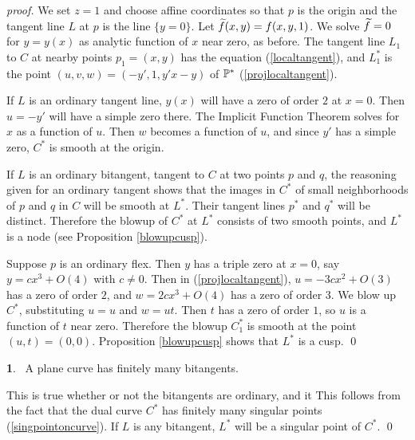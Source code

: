 \documentclass[leqno]{book}
\newcommand\Marginnote[1]{\marginnote{\hspace{-12pt}\normalfont{#1}}}
\theoremstyle{definition}%
\numberwithin{equation}{section}
\theoremstyle{theorem} %
\newtheorem{corollary}[equation]{}
\renewenvironment{proof}{\no \emph{proof.}}{}
\begin{document}
\begin{proof}  We set $z=1$ and
 choose affine coordinates so that $p$ is the origin and the tangent
 line $L$ at $p$ is  the line $\{y=0\}$.  Let $\widetilde f(x,y)=f(x,y,1)$.  We solve
 $\widetilde f = 0$ for $y = y(x)$ as analytic function of $x$ near zero, as
 before.  The tangent line $L_1$ to $C$ at  nearby points
 $p_1=(x,y)$ has the equation (\ref{localtangent}), and $L_1^*$ is
 the point $(u,v,w) =
 (-y',1,y'x-y)$ of $\mathbb{P}^*$ (\ref{projlocaltangent}).


If $L$ is an ordinary tangent line, $y(x)$ will have a zero of order
$2$ at $x=0$.  Then $u = -y'$ will have a simple zero there.  The
Implicit Function Theorem solves for $x$ as a function of $u$.  Then
$w$ becomes a function of $u$, and since $y'$ has a simple zero, $C^*$
is smooth at the origin.

If $L$ is an ordinary bitangent, tangent to $C$ at two points $p$
and $q$, the reasoning given for an ordinary tangent shows that the
images in $C^*$ of small neighborhoods of $p$ and $q$ in $C$ will be
smooth at $L^*$.  Their tangent lines $p^*$ and $q^*$ will
be distinct.  Therefore the blowup of $C^*$ at $L^*$ consists of
two smooth points, and $L^*$ is a node (see Proposition
\ref{blowupcusp}).

Suppose $p$ is an ordinary flex.  Then $y$ has a triple zero at $x=0$,
say $y = cx^3 + O(4)$ with $c\neq 0$.  Then in
(\ref{projlocaltangent}),
$u= -3cx^2+
O(3)$ has a zero of order $2$, and  $w= 2cx^3+O(4)$
 has a zero of order $3$.  We
blow up $C^*$, substituting $u=u$ and $w=ut$. Then $t$ has a zero of
order $1$, so $u$ is a function of $t$ near zero.  Therefore the
blowup $C_1^*$ is smooth at the point $(u,t) = (0,0)$. Proposition
\ref{blowupcusp} shows that $L^*$ is a cusp. \qed\end{proof}

\begin{corollary}{}\Marginnote{finitebitangents}\;\,
A plane curve has
finitely many bitangents.
\label{finitebitangents} \end{corollary}

\no This is true whether or not the bitangents are ordinary, and it
This follows from the fact that the dual curve $C^*$ has finitely many
singular points (\ref{singpointoncurve}).  If $L$ is any bitangent,
$L^*$ will be a singular point of $C^*$.  \qed
\end{document}
